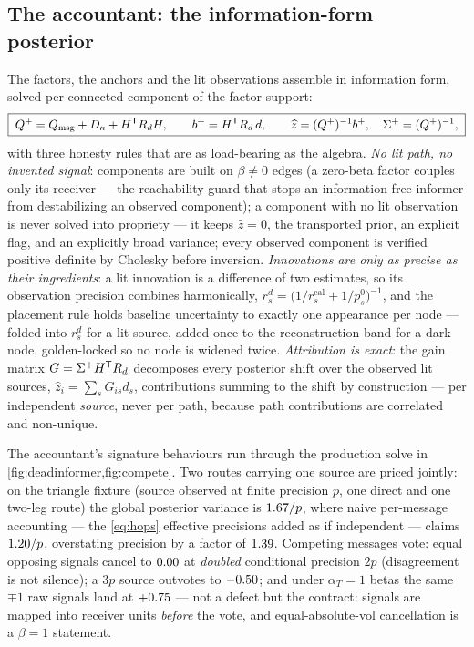\documentclass[11pt]{article}
\newcommand{\Qmsg}{Q_{\mathrm{msg}}}
\begin{document}
\subsection{The accountant: the information-form posterior}
\label{sec:accountant}

The factors, the anchors and the lit observations assemble in information
form, solved per connected component of the factor support:
\begin{equation}
\boxed{\;
Q^+=\Qmsg+D_\kappa+H\T R_d H,
\qquad
b^+=H\T R_d\,d,
\qquad
\widehat z=(Q^+)^{-1}b^+,\quad \Sigma^+=(Q^+)^{-1},
\;}
\label{eq:posterior}
\end{equation}
with three honesty rules that are as load-bearing as the algebra.
\emph{No lit path, no invented signal}: components are built on
$\beta\neq0$ edges (a zero-beta factor couples only its receiver --- the
reachability guard that stops an information-free informer from
destabilizing an observed component); a component with no lit observation
is never solved into propriety --- it keeps $\widehat z=0$, the
transported prior, an explicit flag, and an explicitly broad variance;
every observed component is verified positive definite by Cholesky before
inversion.  \emph{Innovations are only as precise as their ingredients}: a
lit innovation is a difference of two estimates, so its observation
precision combines harmonically,
$r^d_s=\big(1/r^{\mathrm{cal}}_s+1/p^0_s\big)^{-1}$, and the placement
rule holds baseline uncertainty to exactly one appearance per node ---
folded into $r^d_s$ for a lit source, added once to the reconstruction
band for a dark node, golden-locked so no node is widened twice.
\emph{Attribution is exact}: the gain matrix $G=\Sigma^+H^{\mathsf{T}} R_d$
decomposes every posterior shift over the observed lit sources,
$\widehat z_i=\sum_sG_{is}d_s$, contributions summing to the shift by
construction --- per independent \emph{source}, never per path, because
path contributions are correlated and non-unique.

The accountant's signature behaviours run through the production solve in
\cref{fig:deadinformer,fig:compete}.  Two routes carrying one source are
priced jointly: on the triangle fixture (source observed at finite
precision $p$, one direct and one two-leg route) the global posterior
variance is $1.67/p$, where naive per-message accounting --- the
\eqref{eq:hops} effective precisions added as if independent --- claims
$1.20/p$, overstating precision by a factor of
$1.39$.  Competing messages
vote: equal opposing signals cancel to $0.00$ at
\emph{doubled} conditional precision $2p$ (disagreement is not silence); a
$3p$ source outvotes to $-0.50$; and under $\alpha_T=1$ betas the
same $\mp1$ raw signals land at $+0.75$ --- not a defect but
the contract: signals are mapped into receiver units \emph{before} the
vote, and equal-absolute-vol cancellation is a $\beta=1$ statement.
\end{document}
